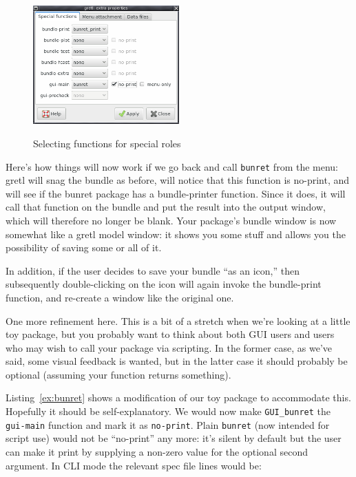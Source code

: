\documentclass[oneside]{book}
\begin{document}
\begin{figure}[htbp]
\begin{center}
  \includegraphics[width=0.5\textwidth]{figures/special-functions} \\
\end{center}
\caption{Selecting functions for special roles}
\label{fig:special-funcs}
\end{figure}

Here's how things will now work if we go back and call \texttt{bunret}
from the menu: gretl will snag the bundle as before, will notice that
this function is no-print, and will see if the \textsf{bunret} package
has a bundle-printer function. Since it does, it will call that
function on the bundle and put the result into the output window,
which will therefore no longer be blank. Your package's bundle window
is now somewhat like a gretl model window: it shows you some stuff and
allows you the possibility of saving some or all of it.

In addition, if the user decides to save your bundle ``as an icon,''
then subsequently double-clicking on the icon will again invoke the
bundle-print function, and re-create a window like the original one.


One more refinement here. This is a bit of a stretch when we're
looking at a little toy package, but you probably want to think about
both GUI users and users who may wish to call your package via
scripting. In the former case, as we've said, some visual feedback is
wanted, but in the latter case it should probably be optional
(assuming your function returns something).

Listing~\ref{ex:bunret} shows a modification of our toy package to
accommodate this. Hopefully it should be self-explanatory. We would
now make \texttt{GUI\_bunret} the \texttt{gui-main} function and mark
it as \texttt{no-print}. Plain \texttt{bunret} (now intended for
script use) would not be ``no-print'' any more: it's silent by default
but the user can make it print by supplying a non-zero value for the
optional second argument. In CLI mode the relevant \textsf{spec} file
lines would be:
\end{document}
